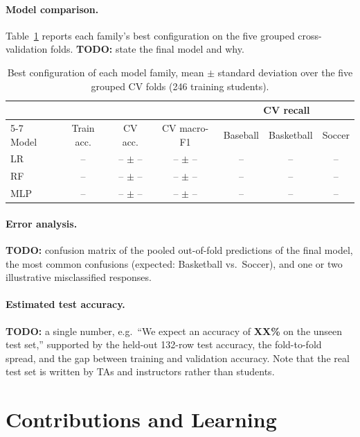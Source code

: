 \documentclass[11pt,letterpaper]{article}
\begin{document}
\paragraph{Model comparison.}
Table~\ref{tab:results} reports each family's best configuration on the five
grouped cross-validation folds. \textbf{TODO:} state the final model and why.

\begin{table}[h]
\centering\small
\begin{tabular}{@{}lcccccc@{}}
\toprule
& & & & \multicolumn{3}{c}{CV recall}\\
\cmidrule(l){5-7}
Model & Train acc. & CV acc. & CV macro-F1 & Baseball & Basketball & Soccer\\
\midrule
LR  & -- & -- $\pm$ -- & -- $\pm$ -- & -- & -- & --\\
RF  & -- & -- $\pm$ -- & -- $\pm$ -- & -- & -- & --\\
MLP & -- & -- $\pm$ -- & -- $\pm$ -- & -- & -- & --\\
\bottomrule
\end{tabular}
\caption{Best configuration of each model family, mean $\pm$ standard deviation
over the five grouped CV folds (246 training students).}
\label{tab:results}
\end{table}

\paragraph{Error analysis.}
\textbf{TODO:} confusion matrix of the pooled out-of-fold predictions of the final
model, the most common confusions (expected: Basketball vs.\ Soccer), and one or two
illustrative misclassified responses.

\paragraph{Estimated test accuracy.}
\textbf{TODO:} a single number, e.g.\ ``We expect an accuracy of \textbf{XX\%} on the
unseen test set,'' supported by the held-out 132-row test accuracy, the fold-to-fold
spread, and the gap between training and validation accuracy. Note that the real
test set is written by TAs and instructors rather than students.

\section{Contributions and Learning}\label{sec:contributions}
\end{document}
